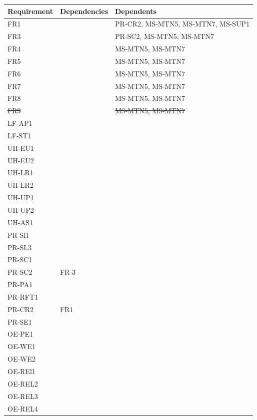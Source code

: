 \documentclass[12pt]{article}
\begin{document}
\begin{tabular}{|p{3cm}|p{3cm}|p{8cm}|}
  \hline
  \textbf{Requirement} & \textbf{Dependencies} & \textbf{Dependents}\\
  \hline
  FR1 & & PR-CR2, MS-MTN5, MS-MTN7, MS-SUP1\\
  FR3 & & PR-SC2, MS-MTN5, MS-MTN7\\
  FR4 & &MS-MTN5, MS-MTN7 \\
  FR5 & & MS-MTN5, MS-MTN7\\
  FR6 & & MS-MTN5, MS-MTN7\\
  FR7 & & MS-MTN5, MS-MTN7\\
  FR8 & & MS-MTN5, MS-MTN7\\
  \sout{FR9} & & \sout{MS-MTN5, MS-MTN7}\\
  LF-AP1 & & \\
  LF-ST1 & & \\
  UH-EU1 & & \\
  UH-EU2 & & \\
  UH-LR1 & & \\
  UH-LR2 & & \\
  UH-UP1 & & \\
  UH-UP2 & & \\
  UH-AS1 & & \\
  PR-Sl1 & & \\
  PR-SL3 & & \\
  PR-SC1 & & \\
  PR-SC2 & FR-3& \\
  PR-PA1 & & \\
  PR-RFT1& & \\
  PR-CR2& FR1& \\
  PR-SE1& & \\
  OE-PE1& & \\
  OE-WE1& & \\
  OE-WE2& & \\
  OE-REl1& & \\
  OE-REL2& & \\
  OE-REL3& & \\
  OE-REL4& & \\
  \hline
\end{tabular}
\end{document}
